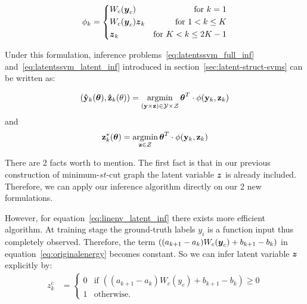 \documentclass[sigconf, anonymous, review]{acmart}
\begin{document}
\begin{equation}
\label{eq:llsvm_feature}
  \phi_k = \left\{
		\begin{aligned}
      & W_c({\boldsymbol{y}}_c) 	& \text{for} \ k=1\\
      & W_c({\boldsymbol{y}}_c){\boldsymbol{z}}_k & \text{for}\ 1<k\le K\\
      & {\boldsymbol{z}}_k & \text{for} \ K<k\le2K-1\\
		\end{aligned}
  \right.
\end{equation}

Under this formulation, inference
problems~\eqref{eq:latentssvm_full_inf}
and~\eqref{eq:latentssvm_latent_inf} introduced in
section~\ref{sec:latent-struct-svms} can be written as:

\begin{align}
  \label{eq:linenv_full_inf}
  (\mathbf{\hat{y}}_k(\boldsymbol{\theta}),\mathbf{\hat{z}}_k(\theta))=\mathop{\textrm{argmin}}_{(\mathbf{y}
  \times \mathbf{z}) \in \mathcal{Y} \times \mathcal{Z}}
  \boldsymbol{\theta}^T\cdot\phi(\mathbf{y}_k,\mathbf{z}_k)
\end{align}
and
\begin{align}
  \label{eq:linenv_latent_inf}
  \mathbf{z}^*_k(\boldsymbol{\theta}) = \mathop{\textrm{argmin}}_{\mathbf{z} \in \mathcal{Z}}
  \boldsymbol{\theta}^T \cdot \phi(\mathbf{y}_k,\mathbf{z}_k)
\end{align}

There are 2 facts worth to mention. The first fact is
that in our previous construction of minimum-$st$-cut graph the
latent variable ${\boldsymbol{z}}$ is already included. Therefore, we can
apply our inference algorithm directly on our 2 new formulations.

However, for equation~\eqref{eq:linenv_latent_inf} there exists
more efficient algorithm. At training stage the ground-truth
labels $y_i$ is a function input thus completely observed.
Therefore, the term $((a_{k+1}-a_k)W_c({\boldsymbol{y}}_c)+b_{k+1}-b_k)$ in
equation~\eqref{eq:originalenergy} becomes constant. So we can
infer latent variable ${\boldsymbol{z}}$ explicitly by:
\begin{align}
  \label{eq:linenv_effi_infer_latent}
  z_k^c &=
          \begin{cases}
            0 & \text{if $((a_{k+1}-a_k)W_c(y_c)+b_{k+1}-b_k)\geq0$} \\
            1 & \text{otherwise}.
          \end{cases}
\end{align}
\end{document}
